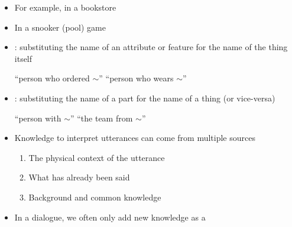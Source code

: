 \documentclass[headrule,footrule]{foils}
\begin{document}
\begin{itemize}\addtolength{\itemsep}{-1.5ex}
\item For example, in a bookstore
  \begin{exe}
    \ex {}
  \end{exe}
\item In a snooker (pool)  game
  \begin{exe}
    \ex {}
  \end{exe}
\item {}: substituting the name of an attribute or feature for the name of the thing itself
  \begin{exe}
    \ex {} ``person who ordered $\sim$''
    \ex {} ``person who wears $\sim$''
  \end{exe}
  \item {}: substituting the name of a part for the name of a thing (or vice-versa)
  \begin{exe}
    \ex {}  ``person with $\sim$''
    \ex {} ``the team from $\sim$''
  \end{exe}
\end{itemize}


\begin{itemize}
\item Knowledge to interpret utterances can come from multiple sources
  \begin{enumerate}
  \item The physical context of the utterance
    \\ 
  \item What has already been said
    \\ 
  \item Background and common knowledge
    \\ 
  \end{enumerate}
\item In a dialogue, we often only add new knowledge as a 
  \begin{exe}
    \ex 
    \begin{xlist}
      \ex {}
      \ex {}
  \end{xlist}
\end{exe}
\end{itemize}
\end{document}
